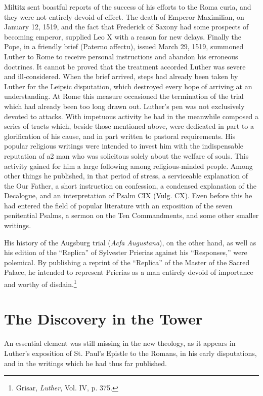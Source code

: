 Miltitz sent boastful reports of the success of his efforts to the
Roma curia, and they were not entirely devoid of effect. The death
of Emperor Maximilian, on January 12, 1519, and the fact that
Frederick of Saxony had some prospects of becoming emperor, supplied Leo
X with a reason for new delays. Finally the Pope, in a friendly
brief (Paterno affectu), issued March 29, 1519, summoned Luther
to Rome to receive personal instructions and abandon his erroneous
doctrines. It cannot be proved that the treatment accorded Luther
was severe and ill-considered. When the brief arrived, steps had already
been taken by Luther for the Leipsic disputation, which destroyed every
hope of arriving at an understanding. At Rome this
measure occasioned the termination of the trial which had already
been too long drawn out.
Luther’s pen was not exclusively devoted to attacks. With impetuous activity
he had in the meanwhile composed a series of tracts
which, beside those mentioned above, were dedicated in part to a
glorification of his cause, and in part written to pastoral requirements.
His popular religious writings were intended to invest him
with the indispensable reputation of a2 man who was solicitous solely
about the welfare of souls. This activity gained for him a large following
among religious-minded people. Among other things he published,
in that period of stress, a serviceable explanation of the Our Father, a
short instruction on confession, a condensed explanation of the
Decalogue, and an interpretation of Psalm CIX (Vulg. CX). Even
before this he had entered the field of popular literature with an
exposition of the seven penitential Psalms, a sermon on the Ten Commandments,
and some other smaller writings.

His history of the Augsburg trial (\textit{Acfa Augustana}), on the other
hand, as well as his edition of the “Replica” of Sylvester Prierias
against his “Responses,” were polemical. By publishing a reprint of
the “Replica” of the Master of the Sacred Palace, he intended to
represent Prierias as a man entirely devoid of importance and worthy
of disdain.\footnote{Grisar, \textit{Luther}, Vol. IV, p. 375.}

\section{The Discovery in the Tower}

An essential element was still missing in the new theology, as it
appears in Luther’s exposition of St. Paul’s Epistle to the Romans, in
his early disputations, and in the writings which he had thus far published.

